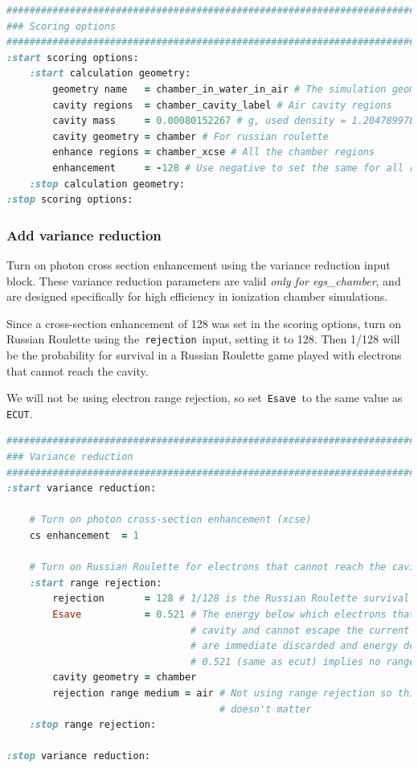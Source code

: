 \documentclass[12pt,twoside]{article}
\begin{document}
{\small
\begin{lstlisting}[language=ruby,backgroundcolor=\color{white}]
##############################################################################
### Scoring options
##############################################################################
:start scoring options:
    :start calculation geometry:
        geometry name   = chamber_in_water_in_air # The simulation geometry
        cavity regions  = chamber_cavity_label # Air cavity regions
        cavity mass     = 0.00080152267 # g, used density = 1.20478997E-03 g/cm^3
        cavity geometry = chamber # For russian roulette
        enhance regions = chamber_xcse # All the chamber regions
        enhancement     = -128 # Use negative to set the same for all regions
    :stop calculation geometry:
:stop scoring options:
\end{lstlisting}
}


\subsubsection{Add variance reduction}
Turn on photon cross section enhancement using the variance reduction input
block.  These variance reduction parameters are valid
\textit{only for egs\_chamber}, and are designed specifically for high
efficiency in ionization chamber simulations.

Since a cross-section enhancement of 128 was set in the scoring options, turn
on Russian Roulette using the \,\Verb|rejection|\, input, setting it to 128.
Then 1/128 will be the probability for survival in a Russian Roulette game
played with electrons that cannot reach the cavity.

We will not be using electron range rejection, so set \,\Verb|Esave|\, to
the same value as \,\Verb|ECUT|.

{\small
\begin{lstlisting}[language=ruby,backgroundcolor=\color{white}]
##############################################################################
### Variance reduction
##############################################################################
:start variance reduction:

    # Turn on photon cross-section enhancement (xcse)
    cs enhancement  = 1

    # Turn on Russian Roulette for electrons that cannot reach the cavity
    :start range rejection:
        rejection       = 128 # 1/128 is the Russian Roulette survival probability
        Esave           = 0.521 # The energy below which electrons that are in the
                                # cavity and cannot escape the current region
                                # are immediate discarded and energy deposited
                                # 0.521 (same as ecut) implies no range rejection
        cavity geometry = chamber
        rejection range medium = air # Not using range rejection so this
                                     # doesn't matter
    :stop range rejection:

:stop variance reduction:
\end{lstlisting}
}
\end{document}

